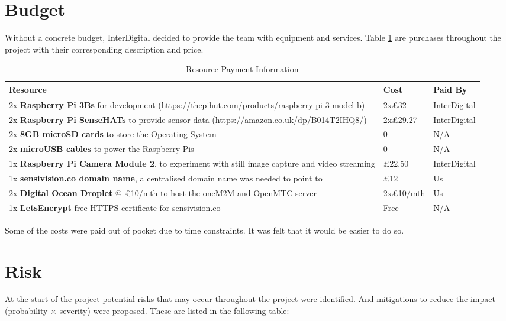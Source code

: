 \section{Budget}

Without a concrete budget, InterDigital decided to provide the team with equipment and services. Table \ref{resource-payment-information} are purchases throughout the project with their corresponding description and price. 

\begin{table}[H]
\centering
\begin{tabularx}{\textwidth}{| X | l | l |}
\hline
\textbf{Resource} & \textbf{Cost} & \textbf{Paid By}
\\ \hline
2x \textbf{Raspberry Pi 3Bs} for development (\url{https://thepihut.com/products/raspberry-pi-3-model-b}) & 2x£32 & InterDigital 
\\ \hline
2x \textbf{Raspberry Pi SenseHATs} to provide sensor data (\url{https://amazon.co.uk/dp/B014T2IHQ8/}) & 2x£29.27 & InterDigital 
\\ \hline
2x \textbf{8GB microSD cards} to store the Operating System & 0 & N/A
\\ \hline
2x \textbf{microUSB cables} to power the Raspberry Pis & 0 & N/A
\\ \hline
1x \textbf{Raspberry Pi Camera Module 2}, to experiment with still image capture and video streaming & £22.50 & InterDigital 
\\ \hline
1x \textbf{sensivision.co domain name}, a centralised domain name was needed to point to & £12 & Us
\\ \hline
2x \textbf{Digital Ocean Droplet} @ £10/mth to host the oneM2M and OpenMTC server & 2x£10/mth & Us
\\ \hline
1x \textbf{LetsEncrypt} free HTTPS certificate for sensivision.co & Free & N/A
\\ \hline
\end{tabularx}
\caption{Resource Payment Information}
\label{resource-payment-information}
\end{table}

Some of the costs were paid out of pocket due to time constraints. It was felt that it would be easier to do so.

\section{Risk}

At the start of the project potential risks that may occur throughout the project were identified. And mitigations to reduce the impact (probability $\times$ severity) were proposed. These are listed in the following table: 

